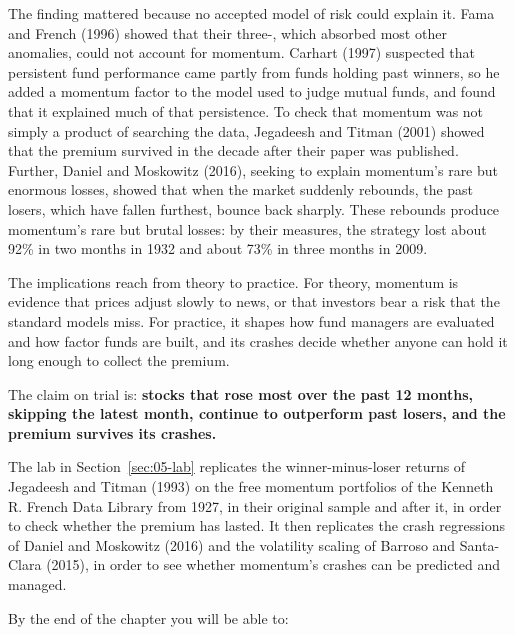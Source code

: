 The finding mattered because no accepted model of risk could explain it. Fama and French (1996) showed that their three-, which absorbed most other anomalies, could not account for momentum. Carhart (1997) suspected that persistent fund performance came partly from funds holding past winners, so he added a momentum factor to the model used to judge mutual funds, and found that it explained much of that persistence. To check that momentum was not simply a product of searching the data, Jegadeesh and Titman (2001) showed that the premium survived in the decade after their paper was published. Further,
Daniel and Moskowitz (2016), seeking to explain momentum's rare but enormous losses, showed that when the market suddenly rebounds, the past losers, which have fallen furthest, bounce back sharply. These rebounds produce momentum's rare but brutal losses: by their measures, the strategy lost about 92\% in two months in 1932 and about 73\% in three months in 2009.

The implications reach from theory to practice. For theory, momentum is evidence that prices adjust slowly to news, or that investors bear a risk that the standard models miss. For practice, it shapes how fund managers are evaluated and how factor funds are built, and its crashes decide whether anyone can hold it long enough to collect the premium. 

The claim on trial is: \textbf{stocks that rose most over the past 12 months, skipping the latest month, continue to outperform past losers, and the premium survives its crashes.}

The lab in Section~\ref{sec:05-lab} replicates the winner-minus-loser returns of Jegadeesh and Titman (1993) on the free momentum portfolios of the Kenneth R. French Data Library from 1927, in their original sample and after it, in order to check whether the premium has lasted. It then replicates the crash regressions of Daniel and Moskowitz (2016) and the volatility scaling of Barroso and Santa-Clara (2015), in order to see whether momentum's crashes can be predicted and managed.

By the end of the chapter you will be able to:

